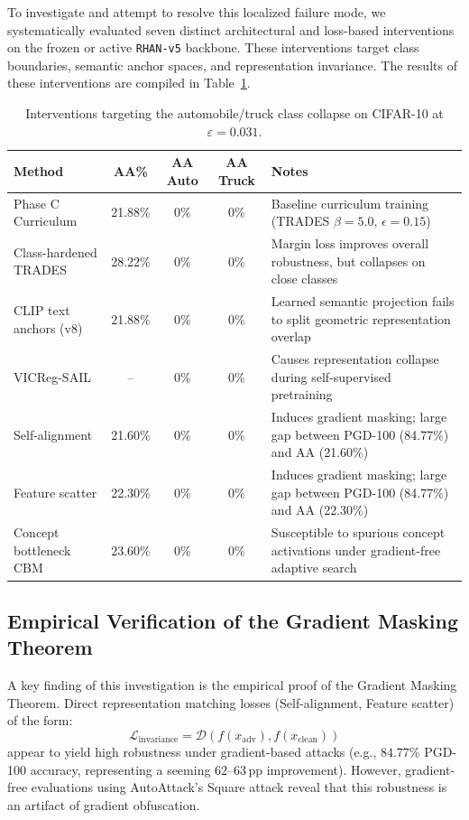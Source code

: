 \documentclass[12pt,a4paper]{article}
\begin{document}
To investigate and attempt to resolve this localized failure mode, we systematically evaluated seven distinct architectural and loss-based interventions on the frozen or active \texttt{RHAN-v5} backbone. These interventions target class boundaries, semantic anchor spaces, and representation invariance. The results of these interventions are compiled in Table~\ref{tab:auto_truck_interventions}.

\begin{table}[H]
\centering
\caption{Interventions targeting the automobile/truck class collapse on CIFAR-10 at $\varepsilon=0.031$.}
\label{tab:auto_truck_interventions}
\renewcommand{\arraystretch}{1.25}
\begin{tabularx}{\textwidth}{lcccX}
\toprule
\textbf{Method} & \textbf{AA\%} & \textbf{AA Auto} & \textbf{AA Truck} & \textbf{Notes} \\
\midrule
Phase C Curriculum     & 21.88\% & 0\% & 0\% & Baseline curriculum training (TRADES $\beta=5.0$, $\epsilon=0.15$) \\
Class-hardened TRADES  & 28.22\% & 0\% & 0\% & Margin loss improves overall robustness, but collapses on close classes \\
CLIP text anchors (v8) & 21.88\% & 0\% & 0\% & Learned semantic projection fails to split geometric representation overlap \\
VICReg-SAIL            & --      & 0\% & 0\% & Causes representation collapse during self-supervised pretraining \\
Self-alignment         & 21.60\% & 0\% & 0\% & Induces gradient masking; large gap between PGD-100 (84.77\%) and AA (21.60\%) \\
Feature scatter        & 22.30\% & 0\% & 0\% & Induces gradient masking; large gap between PGD-100 (84.77\%) and AA (22.30\%) \\
Concept bottleneck CBM & 23.60\% & 0\% & 0\% & Susceptible to spurious concept activations under gradient-free adaptive search \\
\bottomrule
\end{tabularx}
\end{table}

\subsection{Empirical Verification of the Gradient Masking Theorem}

A key finding of this investigation is the empirical proof of the Gradient Masking Theorem. Direct representation matching losses (Self-alignment, Feature scatter) of the form:
\begin{equation}
\mathcal{L}_{\text{invariance}} = \mathcal{D}(f(x_{\text{adv}}), f(x_{\text{clean}}))
\end{equation}
appear to yield high robustness under gradient-based attacks (e.g., $84.77\%$ PGD-100 accuracy, representing a seeming $62\text{--}63\,\text{pp}$ improvement). However, gradient-free evaluations using AutoAttack's Square attack reveal that this robustness is an artifact of gradient obfuscation.
\end{document}
